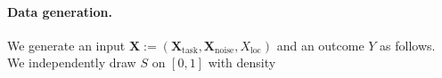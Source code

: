 \documentclass{article} %
\begin{document}
\paragraph{Data generation.}
We generate an input $\mathbf{X}:=(\mathbf{X}_{\mathrm{task}},\mathbf{X}_{\mathrm{noise}},X_{\mathrm{loc}})$ and an outcome $Y$ as follows.
We independently draw $S$ on $[0,1]$ with density
\end{document}
